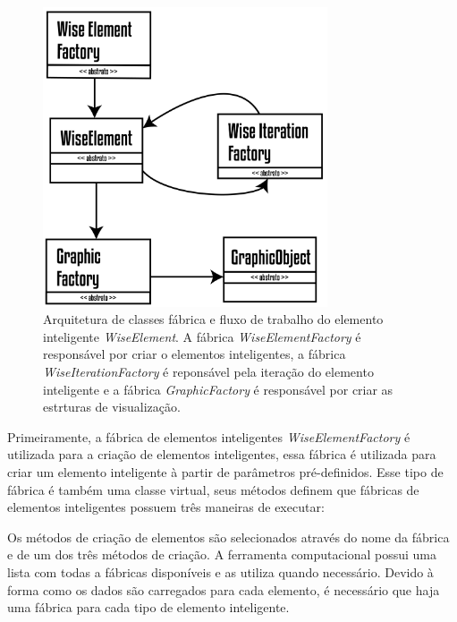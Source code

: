 \begin{figure}[!htbp]
	\centering
	\includegraphics[width=0.75\textwidth]{Figures/WiseElementWorkflow@16x.png}
	\caption{Arquitetura de classes fábrica e fluxo de trabalho do elemento inteligente \textit{WiseElement}. A fábrica \textit{WiseElementFactory} é responsável por criar o elementos inteligentes, a fábrica \textit{WiseIterationFactory} é reponsável pela iteração do elemento inteligente e a fábrica \textit{GraphicFactory} é responsável por criar as estrturas de visualização. }
	\label{fig2:wiselementsworkflow}
\end{figure}

Primeiramente, a fábrica de elementos inteligentes \textit{WiseElementFactory} é utilizada para a criação de elementos inteligentes, essa fábrica é utilizada para criar um elemento inteligente à partir de parâmetros pré-definidos. Esse tipo de fábrica é também uma classe virtual, seus métodos definem que fábricas de elementos inteligentes possuem três maneiras de executar: 

Os métodos de criação de elementos são selecionados através do nome da fábrica e de um dos três métodos de criação. A ferramenta computacional possui uma lista com todas a fábricas disponíveis e as utiliza quando necessário. Devido à forma como os dados são carregados para cada elemento, é necessário que haja uma fábrica para cada tipo de elemento inteligente.

